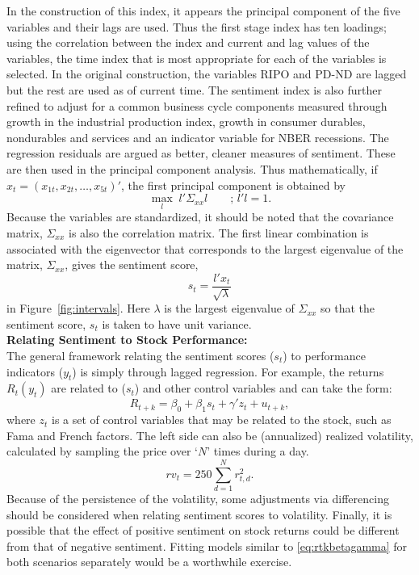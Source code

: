 In the construction of this index, it appears the principal component of the five variables and their lags are used. Thus the first stage index has ten loadings; using the correlation between the index and current and lag values of the variables, the time index that is most appropriate for each of the variables is selected. In the original construction, the variables RIPO and PD-ND are lagged but the rest are used as of current time. The sentiment index is also further refined to adjust for a common business cycle components measured through growth in the industrial production index, growth in consumer durables, nondurables and services and an indicator variable for NBER recessions. The regression residuals are argued as better, cleaner measures of sentiment. These are then used in the principal component analysis. Thus mathematically, if $x_t= (x_{1t}, x_{2t}, \ldots, x_{5t})'$, the first principal component is obtained by
	\begin{equation}
	\max_l \; l' \textstyle \Sigma_{xx} l \qquad ; \, l'l=1 .
	\end{equation}
Because the variables are standardized, it should be noted that the covariance matrix, $\Sigma_{xx}$ is also the correlation matrix. The first linear combination is associated with the eigenvector that corresponds to the largest eigenvalue of the matrix, $\Sigma_{xx}$, gives the sentiment score,
	\begin{equation} \label{eq:stsqlambda}
	s_t= \dfrac{l' x_t}{\sqrt{\lambda}}
	\end{equation}
in Figure~\ref{fig:intervals}. Here $\lambda$ is the largest eigenvalue of $\Sigma_{xx}$ so that the sentiment score, $s_t$ is taken to have unit variance. \\


\noindent\textbf{Relating Sentiment to Stock Performance:} \\


The general framework relating the sentiment scores ($s_t$) to performance indicators ($y_t$) is simply through lagged regression. For example, the returns $R_t(y_t)$ are related to ($s_t$) and other control variables and can take the form:
	\begin{equation} \label{eq:rtkbetagamma}
	R_{t+k}= \beta_0 + \beta_1 s_t + \gamma' z_t + u_{t+k},
	\end{equation}
where $z_t$ is a set of control variables that may be related to the stock, such as Fama and French factors. The left side can also be (annualized) realized volatility, calculated by sampling the price over `$N$' times during a day. 
	\begin{equation}
	rv_t = 250 \sum_{d=1}^N r_{t,d}^2.
	\end{equation}
Because of the persistence of the volatility, some adjustments via differencing should be considered when relating sentiment scores to volatility. Finally, it is possible that the effect of positive sentiment on stock returns could be different from that of negative sentiment. Fitting models similar to \eqref{eq:rtkbetagamma} for both scenarios separately would be a worthwhile exercise. \\


